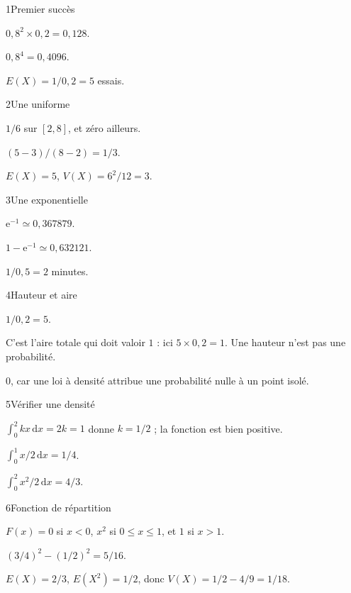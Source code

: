 \begin{corrige}{1}{Premier succès}
\begin{questions}
\item $0{,}8^2\times0{,}2=0{,}128$.
\item $0{,}8^4=0{,}4096$.
\item $E(X)=1/0{,}2=5$ essais.
\end{questions}
\end{corrige}
\begin{corrige}{2}{Une uniforme}
\begin{questions}
\item $1/6$ sur $[2,8]$, et zéro ailleurs.
\item $(5-3)/(8-2)=1/3$.
\item $E(X)=5$, $V(X)=6^2/12=3$.
\end{questions}
\end{corrige}
\begin{corrige}{3}{Une exponentielle}
\begin{questions}
\item $\mathrm e^{-1}\simeq0{,}367879$.
\item $1-\mathrm e^{-1}\simeq0{,}632121$.
\item $1/0{,}5=2$ minutes.
\end{questions}
\end{corrige}
\begin{corrige}{4}{Hauteur et aire}
\begin{questions}
\item $1/0{,}2=5$.
\item C’est l’aire totale qui doit valoir $1$ : ici $5\times0{,}2=1$. Une hauteur n’est pas une probabilité.
\item $0$, car une loi à densité attribue une probabilité nulle à un point isolé.
\end{questions}
\end{corrige}
\begin{corrige}{5}{Vérifier une densité}
\begin{questions}
\item $\int_0^2kx\,\mathrm dx=2k=1$ donne $k=1/2$ ; la fonction est bien positive.
\item $\int_0^1x/2\,\mathrm dx=1/4$.
\item $\int_0^2x^2/2\,\mathrm dx=4/3$.
\end{questions}
\end{corrige}
\begin{corrige}{6}{Fonction de répartition}
\begin{questions}
\item $F(x)=0$ si $x<0$, $x^2$ si $0\leq x\leq1$, et $1$ si $x>1$.
\item $(3/4)^2-(1/2)^2=5/16$.
\item $E(X)=2/3$, $E(X^2)=1/2$, donc $V(X)=1/2-4/9=1/18$.
\end{questions}
\end{corrige}
